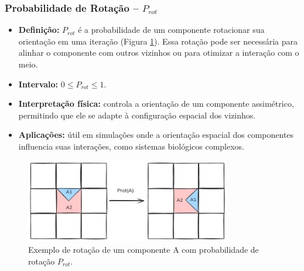 \documentclass[12pt,oneside]{report}
\begin{document}
\subsubsection{Probabilidade de Rotação – \texorpdfstring{$P_{rot}$}{Prot}}
\label{subsubsec:Prot}

\begin{itemize}
    \item \textbf{Definição:} $P_{rot}$ é a probabilidade de um componente rotacionar sua orientação em uma iteração (Figura \ref{fig:rotacao}). Essa rotação pode ser necessária para alinhar o componente com outros vizinhos ou para otimizar a interação com o meio.
    \item \textbf{Intervalo:} $0 \le P_{rot} \le 1$.
    \item \textbf{Interpretação física:} controla a orientação de um componente assimétrico, permitindo que ele se adapte à configuração espacial dos vizinhos.
    \item \textbf{Aplicações:} útil em simulações onde a orientação espacial dos componentes influencia suas interações, como sistemas biológicos complexos.
\end{itemize}

\begin{figure}[H]
    \centering
    \includegraphics[width=0.8\textwidth]{img/rotacao.png}
    \caption{\small Exemplo de rotação de um componente A com probabilidade de rotação $P_{rot}$.}
    \label{fig:rotacao}
\end{figure}
\end{document}
